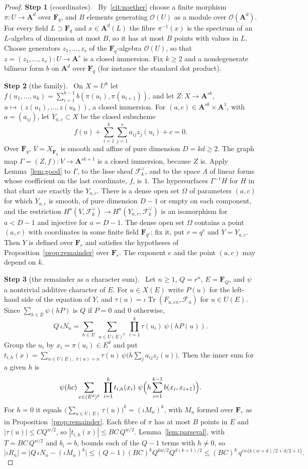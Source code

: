 \documentclass[11pt,a4paper]{article}
\theoremstyle{plain}
\theoremstyle{definition}
\theoremstyle{remark}
\newcommand{\step}[2]{\par\smallskip\noindent\textbf{Step #1} (#2).\ \ignorespaces}
\newcommand{\Fq}{\mathbf F_q}
\newcommand{\Fqb}{\overline{\mathbf F}_q}
\newcommand{\A}{\mathbf A}
\newcommand{\F}{\mathcal F}
\newcommand{\Tr}{\operatorname{Tr}}
\begin{document}
\begin{proof}
\step{1}{coordinates} By~\ref{cit:noether} choose a finite morphism $\pi:U\to\A^d$ over $\Fq$, and $B$ elements generating
$\mathcal O(U)$ as a module over $\mathcal O(\A^d)$. For every field $L\supset\Fq$ and $x\in\A^d(L)$ the fibre
$\pi^{-1}(x)$ is the spectrum of an $L$-algebra of dimension at most $B$, so it has at most $B$ points with values in $L$.
Choose generators $z_1,\dots,z_s$ of the $\Fq$-algebra $\mathcal O(U)$, so that $z=(z_1,\dots,z_s):U\to\A^s$ is a closed
immersion. Fix $k\ge2$ and a nondegenerate bilinear form $b$ on $\A^d$ over $\Fq$ (for instance the standard dot product).

\step{2}{the family} On $X=U^k$ let $f(u_1,\dots,u_k)=\sum_{i=1}^{k-1}b(\pi(u_i),\pi(u_{i+1}))$, and let
$Z:X\to\A^{sk}$, $u\mapsto(z(u_1),\dots,z(u_k))$, a closed immersion. For $(a,c)\in\A^{sk}\times\A^1$, with
$a=(a_{ij})$, let $Y_{a,c}\subset X$ be the closed subscheme
\[
f(u)+\sum_{i=1}^k\sum_{j=1}^sa_{ij}z_j(u_i)+c=0 .
\]
Over $\Fqb$, $V=X_{\Fqb}$ is smooth and affine of pure dimension $D=kd\ge2$. The graph map
$\Gamma=(Z,f):V\to\A^{sk+1}$ is a closed immersion, because $Z$ is. Apply Lemma~\ref{lem:good} to $\Gamma$, to the lisse
sheaf $\F_k^\vee$, and to the space $\Lambda$ of linear forms whose coefficient on the last coordinate, $f$, is $1$. The
hypersurfaces $\Gamma^{-1}H$ for $H$ in that chart are exactly the $Y_{a,c}$. There is a dense open set $\Omega$ of
parameters $(a,c)$ for which $Y_{a,c}$ is smooth, of pure dimension $D-1$ or empty on each component, and the restriction
$H^a(V,\F_k^\vee)\to H^a(Y_{a,c},\F_k^\vee)$ is an isomorphism for $a<D-1$ and injective for $a=D-1$. The dense open set
$\Omega$ contains a point $(a,c)$ with coordinates in some finite field $\mathbf F_{q^e}$; fix it, put $r=q^e$ and
$Y=Y_{a,c}$. Then $Y$ is defined over $\mathbf F_r$ and satisfies the hypotheses of Proposition~\ref{prop:remainder} over
$\mathbf F_r$. The exponent $e$ and the point $(a,c)$ may depend on $k$.

\step{3}{the remainder as a character sum} Let $n\ge1$, $Q=r^n$, $E=\mathbf F_Q$, and $\psi$ a nontrivial additive
character of $E$. For $u\in X(E)$ write $P(u)$ for the left-hand side of the equation of $Y$, and $\tau(u)=\iota\Tr(F_{u,en},\F_{\bar u})$
for $u\in U(E)$. Since $\sum_{h\in E}\psi(hP)$ is $Q$ if $P=0$ and $0$ otherwise,
\[
Q\,\iota N_n=\sum_{h\in E}\ \sum_{u\in U(E)^k}\ \prod_{i=1}^k\tau(u_i)\ \psi(hP(u)).
\]
Group the $u_i$ by $x_i=\pi(u_i)\in E^d$ and put
$t_{i,h}(x)=\sum_{u\in U(E),\ \pi(u)=x}\tau(u)\,\psi\bigl(h\sum_ja_{ij}z_j(u)\bigr)$. Then the inner sum for a given $h$ is
\[
\psi(hc)\sum_{x\in(E^d)^k}\ \prod_{i=1}^kt_{i,h}(x_i)\ \psi\Bigl(h\sum_{i=1}^{k-1}b(x_i,x_{i+1})\Bigr).
\]
For $h=0$ it equals $\bigl(\sum_{u\in U(E)}\tau(u)\bigr)^k=(\iota M_n)^k$, with $M_n$ formed over $\mathbf F_r$ as in
Proposition~\ref{prop:remainder}. Each fibre of $\pi$ has at most $B$ points in $E$ and $|\tau(u)|\le CQ^{w/2}$, so
$|t_{i,h}(x)|\le BC\,Q^{w/2}$. Lemma~\ref{lem:parseval}, with $T=BC\,Q^{w/2}$ and $b_i=b$, bounds each of the $Q-1$ terms
with $h\ne0$, so
\[
|\iota R_n|=\bigl|Q\,\iota N_n-(\iota M_n)^k\bigr|\le(Q-1)(BC)^kQ^{kw/2}Q^{d(k+1)/2}\le(BC)^k\,q^{en\{k(w+d)/2+d/2+1\}}.
\]


\end{proof}
\end{document}
